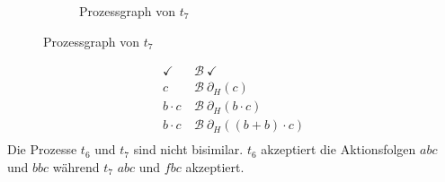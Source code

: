 \documentclass[a4paper]{scrartcl}
\begin{document}
\begin{enumerate}
\begin{figure}[h]
\begin{subfigure}{0.45\textwidth}
                \caption{Prozessgraph von $t_7$}
            \end{subfigure}
            \label{fig:13-4-process}
        \end{figure}
        \begin{equation}
            \begin{split}
                \checkmark \ &\mathcal{B}\  \checkmark \\
                c \ &\mathcal{B}\  \partial_H \left( c \right) \\
                b \cdot c \ &\mathcal{B}\  \partial_H \left( b \cdot c \right) \\
                b \cdot c \ &\mathcal{B}\  \partial_H \left( (b + b) \cdot c \right) \\
            \end{split}
        \end{equation}
        Die Prozesse $t_6$ und $t_7$ sind nicht bisimilar.
        $t_6$ akzeptiert die Aktionsfolgen $abc$ und $bbc$ während $t_7$ $abc$
        und $fbc$ akzeptiert.


\end{enumerate}
\end{document}

